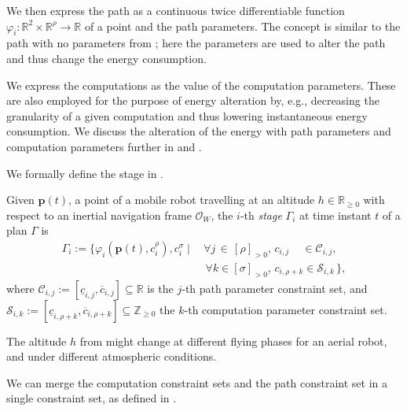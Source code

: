 We then express the path as a continuous twice differentiable function $\varphi_i:\mathbb{R}^2\times\mathbb{R}^\rho\rightarrow\mathbb{R}$ of a point and the path parameters. The concept is similar to the path with no parameters from ; here the parameters are used to alter the path and thus change the energy consumption. 

We express the computations as the value of the computation parameters. These are also employed for the purpose of energy alteration by, e.g., decreasing the granularity of a given computation and thus lowering instantaneous energy consumption. We discuss the alteration of the energy with path parameters and computation parameters further in  and .

We formally define the stage in .

\begin{highlight}  
  \begin{defn}[Stage]\label{def:stage}
    Given $\mathbf{p}(t)$, a point of a mobile robot travelling at an altitude $h\in\mathbb{R}_{\geq 0}$ with respect to an inertial navigation frame $\mathcal{O}_W$, the $i$-th \emph{stage} $\Gamma_i$ at time instant $t$ of a plan $\Gamma$ is
    \begin{equation*}\begin{split}
      \Gamma_i:=\{\varphi_i(\mathbf{p}(t),c_i^\rho),c_i^\sigma\mid
      \,&\forall j\,\in\,[\rho]_{>0},\,c_{i,j}\,\,\,\,\,\,\,\in\mathcal{C}_{i,j},\,\\
        &\,\forall k\in[\sigma]_{>0},\,c_{i,\rho+k}\in\mathcal{S}_{i,k}\,\},
    \end{split}\end{equation*}
    where $\mathcal{C}_{i,j}:=[\underline{c}_{i,j},\overline{c}_{i,j}]\subseteq\mathbb{R}$ is the $j$-th path parameter constraint set, and $\mathcal{S}_{i,k}:=[\underline{c}_{i,\rho+k},\overline{c}_{i,\rho+k}]\subseteq\mathbb{Z}_{\geq 0}$ the $k$-th computation parameter constraint set.
  \end{defn}
\end{highlight}

The altitude $h$ from  might change at different flying phases for an aerial robot, and under different atmospheric conditions.

We can merge the computation constraint sets and the path constraint set in a single constraint set, as defined in .

